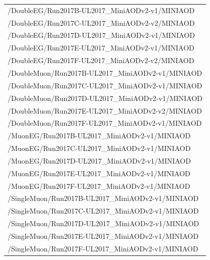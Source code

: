 \begin{table}[h]
\scriptsize
    \centering
    \begin{tabular}{l}
\hline %
/DoubleEG/Run2017B-UL2017\_MiniAODv2-v1/MINIAOD \\
/DoubleEG/Run2017C-UL2017\_MiniAODv2-v2/MINIAOD \\
/DoubleEG/Run2017D-UL2017\_MiniAODv2-v1/MINIAOD \\
/DoubleEG/Run2017E-UL2017\_MiniAODv2-v1/MINIAOD \\
/DoubleEG/Run2017F-UL2017\_MiniAODv2-v2/MINIAOD \\
\hline
/DoubleMuon/Run2017B-UL2017\_MiniAODv2-v1/MINIAOD \\
/DoubleMuon/Run2017C-UL2017\_MiniAODv2-v1/MINIAOD \\
/DoubleMuon/Run2017D-UL2017\_MiniAODv2-v1/MINIAOD \\
/DoubleMuon/Run2017E-UL2017\_MiniAODv2-v2/MINIAOD \\
/DoubleMuon/Run2017F-UL2017\_MiniAODv2-v1/MINIAOD \\
\hline
/MuonEG/Run2017B-UL2017\_MiniAODv2-v1/MINIAOD \\
/MuonEG/Run2017C-UL2017\_MiniAODv2-v1/MINIAOD \\
/MuonEG/Run2017D-UL2017\_MiniAODv2-v1/MINIAOD \\
/MuonEG/Run2017E-UL2017\_MiniAODv2-v1/MINIAOD \\
/MuonEG/Run2017F-UL2017\_MiniAODv2-v1/MINIAOD \\
\hline
/SingleMuon/Run2017B-UL2017\_MiniAODv2-v1/MINIAOD \\
/SingleMuon/Run2017C-UL2017\_MiniAODv2-v1/MINIAOD \\
/SingleMuon/Run2017D-UL2017\_MiniAODv2-v1/MINIAOD \\
/SingleMuon/Run2017E-UL2017\_MiniAODv2-v1/MINIAOD \\
/SingleMuon/Run2017F-UL2017\_MiniAODv2-v1/MINIAOD \\
\hline
        \end{tabular}
\small
    \label{tab:datasets_data_17}
\end{table}


